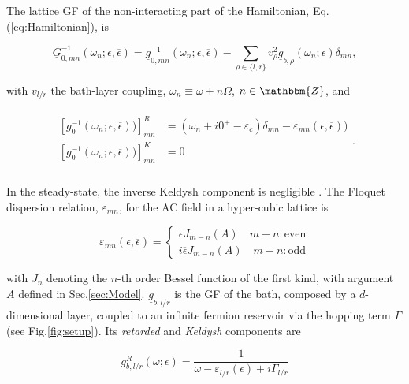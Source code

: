 \documentclass[aps,prb,groupedaddress,showpacs,twocolumn,superscriptaddress,10pt]{revtex4-2}
\makeatletter
\newcommand{\se}{Sec.\@\xspace}
\makeatother
\begin{document}
The lattice GF of the non-interacting part of the Hamiltonian, Eq. (\ref{eq:Hamiltonian}), is 
 
\begin{equation}\label{eq:non-int_InvGF} 
\underline{G}^{-1}_{0,mn}(\omega_n;\epsilon,\overline{\epsilon}) =  \underline{g}^{-1}_{0,mn}(\omega_n;\epsilon,\overline{\epsilon}) - \sum_{\rho\in\{l,r\}}v^2_{\rho}\underline{g}_{b,\rho}(\omega_n;\epsilon)\delta_{mn},
\end{equation}

 with $v_{l/r}$ the bath-layer coupling, $\omega_n \equiv \omega + n\Omega$, $n\in\mathbbm{Z}$, and 

 \begin{align}\label{eq:inv_non-int_lat_GF_comps}
\begin{split}
\left[ g^{-1}_{0}(\omega_n;\epsilon,\overline{\epsilon})) \right]^{R}_{mn} & = \left( \omega_n + i0^{+} -\varepsilon_c \right)\delta_{mn} - \varepsilon_{mn}(\epsilon,\overline{\epsilon})) \\
\left[ g^{-1}_{0}(\omega_n;\epsilon,\overline{\epsilon})) \right]^{K}_{mn} & = 0 \\
\end{split}.
\end{align}

In the steady-state, the inverse Keldysh component is negligible \cite{so.do.18}. The Floquet dispersion relation, $\varepsilon_{mn}$, for the AC field in a hyper-cubic lattice is \cite{ts.ok.08} 
 
\begin{equation}
\label{eq:Floquet_disp}
\varepsilon_{mn}(\epsilon,\overline{\epsilon}) = \left\{
                \begin{array}{ll}
                  \epsilon J_{m-n}(A) \quad m-n:\textrm{even} \\
                  i\overline{\epsilon}J_{m-n}(A) \quad m-n:\textrm{odd}
                \end{array}
              \right  .
\end{equation} 

with $J_n$ denoting the $n$-th order Bessel function of the first kind, with argument $A$ defined in \se\ref{sec:Model}.  $\underline{g}_{b,l/r}$ is the GF of the bath, composed by a $d$-dimensional layer, coupled to an infinite fermion reservoir via the hopping term $\Gamma$ (see Fig.\ref{fig:setup}). 
Its \emph{retarded} and \emph{Keldysh} components are 

\begin{equation}
\label{eq:retarded_bath_GF}
g^{R}_{b,l/r}(\omega;\epsilon) = \frac{1}{\omega-\varepsilon_{l/r}(\epsilon)+i\Gamma_{l/r}}
\end{equation}
\end{document}
